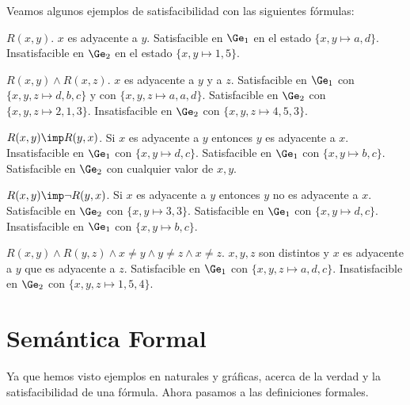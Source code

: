 \documentclass[11pt,letterpaper]{article}
\begin{document}
Veamos algunos ejemplos de satisfacibilidad con las siguientes fórmulas:

\be
\item $R(x,y)$. $x$ es adyacente a $y$.  Satisfacible en $\Ge_1$ en el estado $\{x,y\mapsto a,d\}$. Insatisfacible
  en $\Ge_2$ en el estado $\{x,y\mapsto 1,5\}$.
\item $R(x,y)\land R(x,z)$. $x$ es adyacente a $y$ y a $z$. Satisfacible en $\Ge_1$ con $\{x,y,z\mapsto d,b,c\}$
  y con $\{x,y,z\mapsto a,a,d\}$. Satisfacible en $\Ge_2$ con $\{x,y,z\mapsto
  2,1,3\}$. Insatisfacible en $\Ge_2$ con $\{x,y,z\mapsto 4,5,3\}$.
\item $R(x,y)\imp R(y,x)$. Si $x$ es adyacente a $y$ entonces $y$ es adyacente
  a $x$. Insatisfacible en $\Ge_1$ con $\{x,y\mapsto
  d,c\}$. Satisfacible en $\Ge_1$ con $\{x,y\mapsto b,c\}$. Satisfacible en
  $\Ge_2$ con cualquier valor de $x,y$. 
\item $R(x,y)\imp \lnot R(y,x)$. Si $x$ es adyacente a $y$ entonces $y$ no es adyacente
  a $x$. Satisfacible en $\Ge_2$ con $\{x,y\mapsto
  3,3\}$. Satisfacible en $\Ge_1$ con $\{x,y\mapsto d,c\}$. Insatisfacible en
  $\Ge_1$ con $\{x,y\mapsto b,c\}$.
\item $R(x,y)\land R(y,z)\land x\neq y\land y\neq z\land x\neq
  z$. $x,y,z$ son distintos y $x$ es adyacente a $y$ que es adyacente a
  $z$. Satisfacible en $\Ge_1$ con $\{x,y,z\mapsto a,d,c\}$. Insatisfacible
  en $\Ge_2$ con $\{x,y,z\mapsto 1,5,4\}$.

\ee

\section{Semántica Formal}

Ya que hemos visto ejemplos en naturales y gráficas, acerca de la verdad y la
satisfacibilidad de una fórmula. Ahora pasamos a las definiciones formales.
\end{document}
